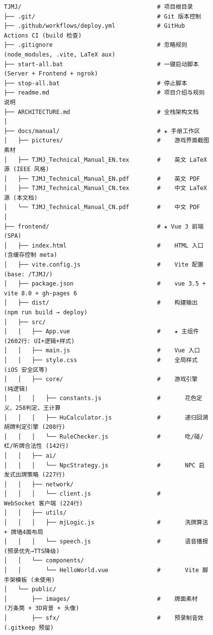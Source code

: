 \documentclass[11pt,a4paper]{article}
\begin{document}
\begin{figure}[H]
\centering
\small
\begin{verbatim}
TJMJ/                                       # 项目根目录
├── .git/                                   # Git 版本控制
├── .github/workflows/deploy.yml            # GitHub Actions CI (build 检查)
├── .gitignore                              # 忽略规则 (node_modules, .vite, LaTeX aux)
├── start-all.bat                           # 一键启动脚本 (Server + Frontend + ngrok)
├── stop-all.bat                            # 停止脚本
├── readme.md                               # 项目介绍与规则说明
├── ARCHITECTURE.md                         # 全栈架构文档
│
├── docs/manual/                            # ★ 手册工作区
│   ├── pictures/                           #    游戏界面截图素材
│   ├── TJMJ_Technical_Manual_EN.tex        #    英文 LaTeX 源 (IEEE 风格)
│   ├── TJMJ_Technical_Manual_EN.pdf        #    英文 PDF
│   ├── TJMJ_Technical_Manual_CN.tex        #    中文 LaTeX 源 (本文档)
│   └── TJMJ_Technical_Manual_CN.pdf        #    中文 PDF
│
├── frontend/                               # ★ Vue 3 前端 (SPA)
│   ├── index.html                          #    HTML 入口 (含缓存控制 meta)
│   ├── vite.config.js                      #    Vite 配置 (base: /TJMJ/)
│   ├── package.json                        #    vue 3.5 + vite 8.0 + gh-pages 6
│   ├── dist/                               #    构建输出 (npm run build → deploy)
│   ├── src/
│   │   ├── App.vue                         #    ★ 主组件 (2602行: UI+逻辑+样式)
│   │   ├── main.js                         #    Vue 入口
│   │   ├── style.css                       #    全局样式 (iOS 安全区等)
│   │   ├── core/                           #    游戏引擎 (纯逻辑)
│   │   │   ├── constants.js                #       花色定义、258判定、王计算
│   │   │   ├── HuCalculator.js             #       递归回溯胡牌判定引擎 (208行)
│   │   │   └── RuleChecker.js              #       吃/碰/杠/听牌合法性 (142行)
│   │   ├── ai/
│   │   │   └── NpcStrategy.js              #       NPC 启发式出牌策略 (227行)
│   │   ├── network/
│   │   │   └── client.js                   #       WebSocket 客户端 (224行)
│   │   ├── utils/
│   │   │   ├── mjLogic.js                  #       洗牌算法 + 牌墙4面布局
│   │   │   └── speech.js                   #       语音播报 (预录优先→TTS降级)
│   │   └── components/
│   │       └── HelloWorld.vue              #       Vite 脚手架模板 (未使用)
│   └── public/
│       ├── images/                         #    牌面素材 (万条筒 + 3D背景 + 头像)
│       ├── sfx/                            #    预录制音效 (.gitkeep 预留)

\end{verbatim}
\end{figure}
\end{document}
